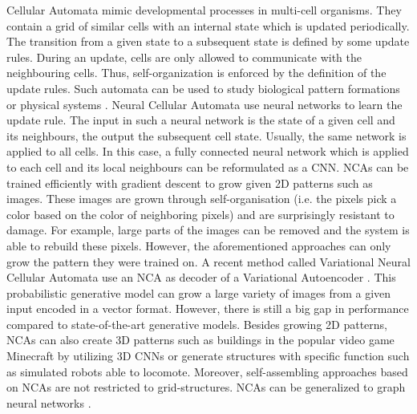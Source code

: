 
Cellular Automata mimic developmental processes in multi-cell organisms.
They contain a grid of similar cells with an internal state which is updated periodically.
The transition from a given state to a subsequent state is defined by some update rules.
During an update, cells are only allowed to communicate with the neighbouring cells.
Thus, self-organization is enforced by the definition of the update rules.
Such automata can be used to study biological pattern formations  or physical systems .
Neural Cellular Automata  use neural networks to learn the update rule.
The input in such a neural network is the state of a given cell and its neighbours, the output the subsequent cell state.
Usually, the same network is applied to all cells.
In this case, a fully connected neural network which is applied to each cell and its local neighbours can be reformulated as a CNN.
NCAs can be trained efficiently with gradient descent to grow given 2D patterns such as images.
These images are grown through self-organisation (i.e. the pixels pick a color based on the color of neighboring pixels) and are surprisingly resistant to damage.
For example, large parts of the images can be removed and the system is able to rebuild these pixels.
However, the aforementioned approaches can only grow the pattern they were trained on.
A recent method called Variational Neural Cellular Automata  use an NCA as decoder of a Variational Autoencoder .
This probabilistic generative model can grow a large variety of images from a given input encoded in a vector format.
However, there is still a big gap in performance compared to state-of-the-art generative models.
Besides growing 2D patterns, NCAs can also create 3D patterns such as buildings in the popular video game Minecraft by utilizing 3D CNNs  or generate structures with specific function such as simulated robots able to locomote.
Moreover, self-assembling approaches based on NCAs are not restricted to grid-structures.
NCAs can be generalized to graph neural networks .
